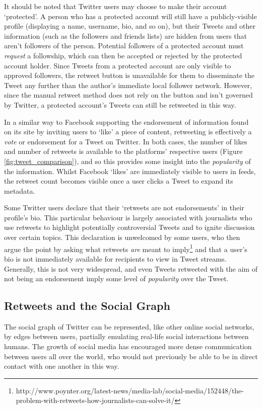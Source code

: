 It should be noted that Twitter users may choose to make their account `protected'. A person who has a protected account will still have a publicly-visible profile (displaying a name, username, bio, and so on), but their Tweets and other information (such as the followers and friends lists) are hidden from users that aren't followers of the person. Potential followers of a protected account must \textit{request} a followship, which can then be accepted or rejected by the protected account holder. Since Tweets from a protected account are only visible to approved followers, the retweet button is unavailable for them to disseminate the Tweet any further than the author's immediate local follower network. However, since the manual retweet method does not rely on the button and isn't governed by Twitter, a protected account's Tweets can still be retweeted in this way.

In a similar way to Facebook supporting the endorsement of information found on its site by inviting users to `like' a piece of content, retweeting is effectively a \textit{vote} or endorsement for a Tweet on Twitter. In both cases, the number of likes and number of retweets is available to the platforms' respective users (Figure \ref{fig:tweet_comparison}), and so this provides some insight into the \textit{popularity} of the information. Whilst Facebook `likes' are immediately visible to users in feeds, the retweet count becomes visible once a user clicks a Tweet to expand its metadata.

Some Twitter users declare that their `retweets are not endorsements' in their profile's bio. This particular behaviour is largely associated with journalists who use retweets to highlight potentially controversial Tweets and to ignite discussion over certain topics. This declaration is unwelcomed by some users, who then argue the point by asking what retweets \textit{are} meant to imply\footnote{http://www.poynter.org/latest-news/media-lab/social-media/152448/the-problem-with-retweets-how-journalists-can-solve-it/} and that a user's bio is not immediately available for recipients to view in Tweet streams. Generally, this is not very widespread, and even Tweets retweeted with the aim of not being an endorsement imply some level of \textit{popularity} over the Tweet. 


\subsection{Retweets and the Social Graph}
The social graph of Twitter can be represented, like other online social networks, by edges between users, partially emulating real-life social interactions between humans. The growth of social media has encouraged more dense communication between users all over the world, who would not previously be able to be in direct contact with one another in this way.


